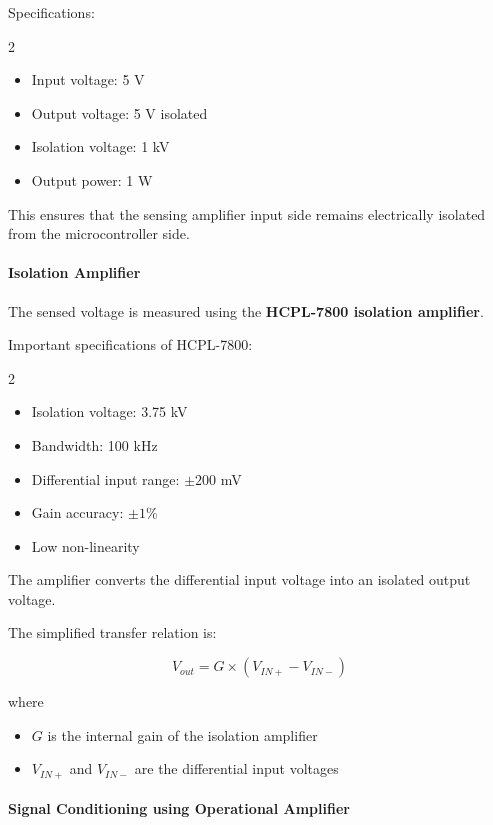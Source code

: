 Specifications:

\begin{multicols}{2}
\begin{itemize}
\item Input voltage: 5 V
\item Output voltage: 5 V isolated
\item Isolation voltage: 1 kV
\item Output power: 1 W
\end{itemize}
\end{multicols}

This ensures that the sensing amplifier input side remains electrically isolated from the microcontroller side.

\paragraph{Isolation Amplifier}

The sensed voltage is measured using the \textbf{HCPL-7800 isolation amplifier}.

Important specifications of HCPL-7800:

\begin{multicols}{2}
\begin{itemize}
\item Isolation voltage: 3.75 kV
\item Bandwidth: 100 kHz
\item Differential input range: $\pm 200$ mV
\item Gain accuracy: $\pm 1\%$
\item Low non-linearity
\end{itemize}
\end{multicols}

The amplifier converts the differential input voltage into an isolated output voltage.

The simplified transfer relation is:

\[
V_{out} = G \times (V_{IN+} - V_{IN-})
\]

where

\begin{itemize}
\item $G$ is the internal gain of the isolation amplifier
\item $V_{IN+}$ and $V_{IN-}$ are the differential input voltages
\end{itemize}

\paragraph{Signal Conditioning using Operational Amplifier}

